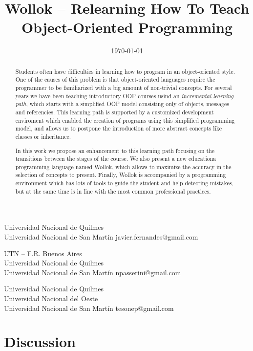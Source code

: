 \documentclass[preprint,10pt]{sigplanconf}
\begin{document}
\title{Wollok -- Relearning How To Teach Object-Oriented Programming}
  {Universidad Nacional de Quilmes \\ Universidad Nacional de San Martín}
  {javier.fernandes@gmail.com}
  
  {UTN -- F.R. Buenos Aires \\ Universidad Nacional de Quilmes \\ Universidad Nacional de San Martín}
  {npasserini@gmail.com}
  
  {Universidad Nacional de Quilmes \\ Universidad Nacional del Oeste \\ Universidad Nacional de San Martín}
  {tesonep@gmail.com}

\date{\today}
\maketitle

\begin{abstract}
Students often have difficulties in learning how to program in an object-oriented style.
One of the causes of this problem is that object-oriented languages require the programmer to be familiarized with a big amount of non-trivial concepts.
For several years we have been teaching introductory OOP courses usind an \emph{incremental learning path}, 
which starts with a simplified OOP model consisting only of objects, messages and referencies.
This learning path is supported by a customized development enviroment which enabled the creation of programs using this {simplified programming model},
and allows us to postpone the introduction of more abstract concepts like classes or inheritance.

In this work we propose an enhancement to this learning path focusing on the transitions between the stages of the course.
We also present a new educationa programming language named Wollok, which allows to maximize the accuracy in the selection of concepts to present.
Finally, Wollok is accompanied by a programming environment which has lots of tools to guide the student and help detecting mistakes, 
but at the same time is in line with the most common professional practices.
\end{abstract}






\section{Discussion}
\label{sec:discussion}
\end{document}
